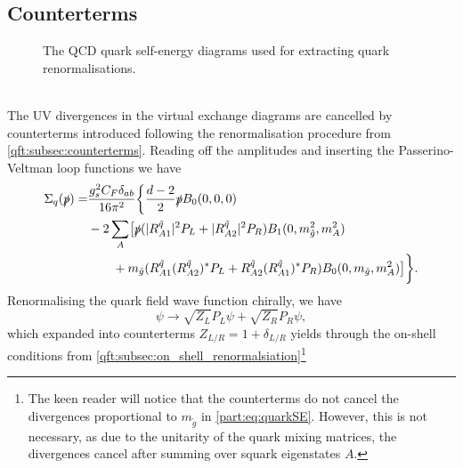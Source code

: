 \documentclass[../main.tex]{subfiles}
\begin{document}
\subsection{Counterterms}
\begin{figure}[ht!]
  \centering
  \begin{subfigure}{.49\textwidth}
    \centering
    \caption{}
    \label{part:subfig:quarkSE_gluon}
  \end{subfigure}
  \begin{subfigure}{.49\textwidth}
    \centering
    \caption{}
    \label{part:subfig:quarkSE_gluino}
  \end{subfigure}
  \caption{The QCD quark self-energy diagrams used for extracting quark renormalisations.}
  \label{part:fig:quarkSE}
\end{figure}
\\
The UV divergences in the virtual exchange diagrams are cancelled by counterterms introduced following the renormalisation procedure from \cref{qft:subsec:counterterms}.
Reading off the amplitudes and inserting the Passerino-Veltman loop functions we have
\begin{align}
  \label{part:eq:quarkSE}
  \nonumber
  \Sigma_q(\slashed{p}) = & \frac{g_s^2 C_F \delta_{ab}}{16\pi^2} \biggl\{
  \frac{d-2}{2} \slashed{p} B_0(0,0,0)                                                                                                                                                \\
  \nonumber
                          & - 2\sum_A \bigl[
  \slashed{p} (|R^{\tilde{q}}_{A1}|^2P_L + |R^{\tilde{q}}_{A2}|^2P_R)B_1(0,m_{\tilde{g}}^2,m_A^2)                                                                                     \\
                          & \qquad + m_{\tilde{g}} (R^{\tilde{q}}_{A1} (R^{\tilde{q}}_{A2})^\ast P_L + R^{\tilde{q}}_{A2} (R^{\tilde{q}}_{A1})^\ast P_R) B_0(0, m_{\tilde{g}}, m_A^2)
  \bigr]\biggr\}.
\end{align}
Renormalising the quark field wave function chirally, we have
\begin{equation}
  \psi \to \sqrt{Z_L} P_L \psi + \sqrt{Z_R} P_R \psi,
\end{equation}
which expanded into counterterms \(Z_{L/R} = 1 + \delta_{L/R}\) yields through the on-shell conditions from \cref{qft:subsec:on_shell_renormalsiation}\footnote{The keen reader will notice that the counterterms do not cancel the divergences proportional to \(m_{\tilde{g}}\) in \cref{part:eq:quarkSE}. However, this is not necessary, as due to the unitarity of the quark mixing matrices, the divergences cancel after summing over squark eigenstates \(A\).}
\end{document}
